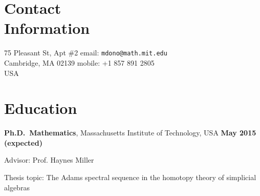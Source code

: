 \documentclass[margin,line]{resume}
\begin{document}
\begin{resume}

\vspace{4mm}
    \section{\mysidestyle Contact\\Information}

    75 Pleasant St, Apt \#2                 \hfill email: \texttt{mdono@math.mit.edu}                 
\vspace{0mm}\\\vspace{0mm}%
    Cambridge, MA  02139                    \hfill mobile: +1 857 891 2805 \vspace{0mm}\\\hspace{-1mm} 				
    USA                                  





    \section{\mysidestyle Education}

 \textbf{Ph.D.\ Mathematics}, Massachusetts Institute of Technology, USA
\hfill \textbf{May 2015  (expected)}\\%

\vspace{-3mm}
    \begin{list2}
        \item Advisor: Prof. Haynes Miller
        \item Thesis topic: The Adams spectral sequence in the homotopy theory of simplicial algebras
    \end{list2}
    

\end{resume}
\end{document}

